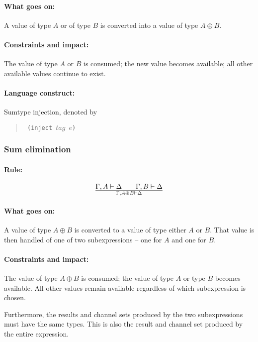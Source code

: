 \documentclass[a4paper]{article}
\begin{document}
\paragraph{What goes on:} A value of type $A$ or of type $B$ is
converted into a value of type $A \oplus B$.

\paragraph{Constraints and impact:} The value of type $A$ or $B$ is
consumed; the new value becomes available; all other available values
continue to exist.

\paragraph{Language construct:} Sumtype injection, denoted by
\begin{quote}\tt
  (inject $\mathit{tag}$ $e$)
\end{quote}


\subsubsection{Sum elimination}
\paragraph{Rule:}
$$
{
  \Gamma,A \vdash \Delta \qquad \Gamma,B \vdash \Delta
}\over{
  \Gamma, A\oplus B \vdash \Delta
}
$$

\paragraph{What goes on:} A value of type $A \oplus B$ is converted to
a value of type either $A$ or $B$. That value is then handled of one
of two subexpressions -- one for $A$ and one for $B$.

\paragraph{Constraints and impact:} The value of type $A \oplus B$ is
consumed; the value of type $A$ or type $B$ becomes available.
All other values remain available regardless of which subexpression is chosen.

Furthermore, the results and channel sets produced by the two
subexpressions must have the same types.
This is also the result and channel set produced by the entire
expression.
\end{document}
